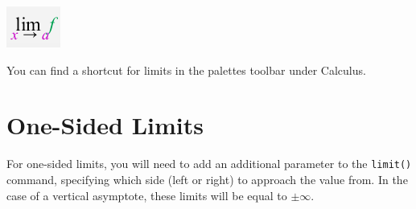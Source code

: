 \begin{marginfigure}
\centering
\includegraphics[scale=0.8]{tutorials/figures/palettelimit.png}
\caption{You can find a shortcut for limits in the palettes toolbar under Calculus.}
\end{marginfigure}

\section{One-Sided Limits}

For one-sided limits, you will need to add an additional parameter to the \texttt{limit()} command, specifying which side (left or right) to approach the value from. In the case of a vertical asymptote, these limits will be equal to $\pm \infty$.

\begin{maplegroup}
\begin{mapleinput}
\end{mapleinput}
\mapleresult
\begin{maplelatex}
\end{maplelatex}
\end{maplegroup}

\begin{maplegroup}
\begin{mapleinput}
\end{mapleinput}
\mapleresult
{}
\end{maplegroup}

\begin{maplegroup}
\begin{mapleinput}
\end{mapleinput}
\mapleresult
\begin{maplelatex}
\end{maplelatex}
\end{maplegroup}

